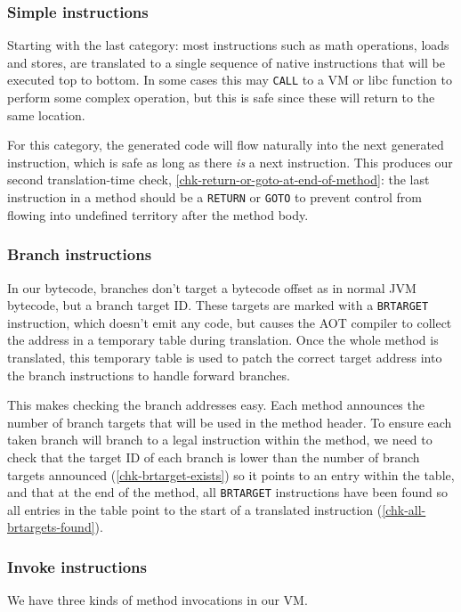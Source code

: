 \subsubsection{Simple instructions}
Starting with the last category: most instructions such as math operations, loads and stores, are translated to a single sequence of native instructions that will be executed top to bottom. In some cases this may \texttt{CALL} to a VM or libc function to perform some complex operation, but this is safe since these will return to the same location.

For this category, the generated code will flow naturally into the next generated instruction, which is safe as long as there \emph{is} a next instruction. This produces our second translation-time check, \ref{chk-return-or-goto-at-end-of-method}: the last instruction in a method should be a \texttt{RETURN} or \texttt{GOTO} to prevent control from flowing into undefined territory after the method body.

\subsubsection{Branch instructions}
In our bytecode, branches don't target a bytecode offset as in normal JVM bytecode, but a branch target ID. These targets are marked with a \texttt{BRTARGET} instruction, which doesn't emit any code, but causes the AOT compiler to collect the address in a temporary table during translation. Once the whole method is translated, this temporary table is used to patch the correct target address into the branch instructions to handle forward branches.

This makes checking the branch addresses easy. Each method announces the number of branch targets that will be used in the method header. To ensure each taken branch will branch to a legal instruction within the method, we need to check that the target ID of each branch is lower than the number of branch targets announced (\ref{chk-brtarget-exists}) so it points to an entry within the table, and that at the end of the method, all \texttt{BRTARGET} instructions have been found so all entries in the table point to the start of a translated instruction (\ref{chk-all-brtargets-found}).

\subsubsection{Invoke instructions}
We have three kinds of method invocations in our VM.

